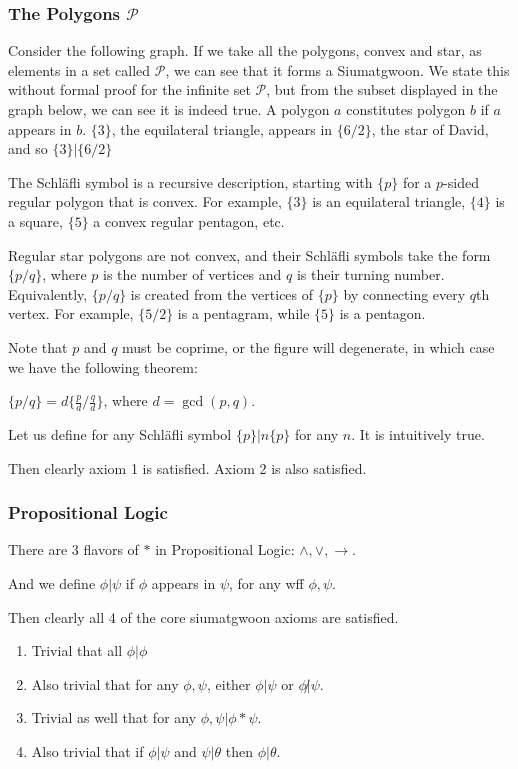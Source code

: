 \subsubsection{The Polygons $\mathcal{P}$}

Consider the following graph. If we take all the polygons, convex and star, as elements in a set called $\mathcal{P}$, we can see that it forms a Siumatgwoon. We state this without formal proof for the infinite set $\mathcal{P}$, but from the subset displayed in the graph below, we can see it is indeed true. A polygon $a$ constitutes polygon $b$ if $a$ appears in $b$. $\{3\}$, the equilateral triangle, appears in $\{6/2\}$, the star of David, and so $\{3\} |\{6/2\}$

The Schläfli symbol is a recursive description, starting with $\{p\}$ for a $p$-sided regular polygon that is convex. For example, $\{3\}$ is an equilateral triangle, $\{4\}$ is a square, $\{5\}$ a convex regular pentagon, etc.

Regular star polygons are not convex, and their Schläfli symbols take the form $\{p/q\}$, where $p$ is the number of vertices and $q$ is their turning number. Equivalently, $\{p/q\}$ is created from the vertices of $\{p\}$ by connecting every $q$th vertex. For example, $\{5/2\}$ is a pentagram, while $\{5\}$ is a pentagon.

Note that $p$ and $q$ must be coprime, or the figure will degenerate, in which case we have the following theorem:

$\{p/q\}=d\{ \frac{p}{d} / \frac{q}{d} \}$, where $d=\gcd(p,q)$.

Let us define for any Schläfli symbol $\{p\} | n\{p\}$ for any $n$. It is intuitively true.

Then clearly axiom 1 is satisfied. Axiom 2 is also satisfied.

\subsubsection{Propositional Logic}

There are 3 flavors of $*$ in Propositional Logic: $\wedge, \vee, \rightarrow$. 

And we define $\phi | \psi$ if $\phi$ appears in $\psi$, for any wff $\phi, \psi$.

Then clearly all 4 of the core siumatgwoon axioms are satisfied. 

\begin{enumerate}
\item Trivial that all $\phi | \phi$
\item Also trivial that for any $\phi, \psi$, either $\phi|\psi$ or $\phi\not|\psi$.
\item Trivial as well that for any $\phi,\psi | \phi * \psi$.
\item Also trivial that if $\phi | \psi$ and $\psi | \theta$ then $\phi | \theta$.
\end{enumerate}


